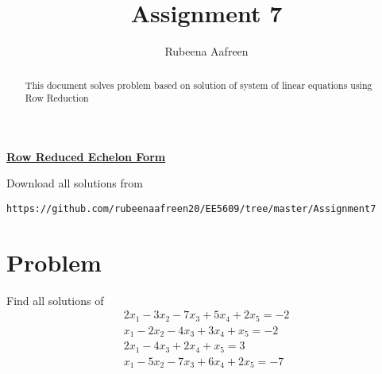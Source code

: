 \documentclass[journal,12pt,twocolumn]{IEEEtran}
\begin{document}
       \def\rightbox#1{\makebox[0in][r]{#1}}
       \def\centbox#1{\makebox[0in]{#1}}
       \def\topbox#1{\raisebox{-\baselineskip}[0in][0in]{#1}}
       \def\midbox#1{\raisebox{-0.5\baselineskip}[0in][0in]{#1}}
  \vspace{3cm}
  \title{Assignment 7}
  \author{Rubeena Aafreen}
  \maketitle
  \newpage
  \bigskip
  \renewcommand{\thetable}{\theenumi}
  \begin{center}
{\underline{\Large \bf Row Reduced Echelon Form}}
\end{center}
\begin{abstract}
This document solves problem based on solution of system of linear equations using Row Reduction
\end{abstract}
%
Download all solutions from 
\begin{lstlisting}
https://github.com/rubeenaafreen20/EE5609/tree/master/Assignment7
\end{lstlisting}
%
\vspace{-5mm}
\section{Problem}
Find all solutions of
 \begin{align}
 2x_1-3x_2-7x_3+5x_4+2x_5=-2\\x_1-2x_2-4x_3+3x_4+x_5=-2\\2x_1-4x_3+2x_4+x_5=3\\x_1-5x_2-7x_3+6x_4+2x_5=-7
 \end{align}
\end{document}

